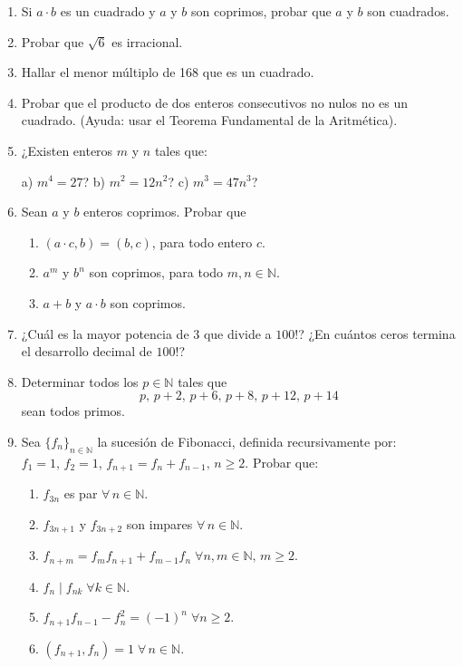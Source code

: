 \documentclass[a4paper,12pt,twoside,spanish,reqno]{amsbook}
\numberwithin{equation}{section}
\begin{document}
\begin{enumerate}
\item Si $a\cdot b$ es un cuadrado y $a$ y $b$ son coprimos, probar que $a$ y $b$ son cuadrados.


\item Probar que $\sqrt 6$ es irracional.





\item Hallar el menor múltiplo de 168 que es un cuadrado.


\item Probar que el producto de dos enteros consecutivos no nulos no es un cuadrado. (Ayuda: usar el Teorema Fundamental de la Aritmética).



\item ¿Existen enteros $m$ y $n$ tales que:

a) $m^4=27$? \qquad \qquad b) $m^2 = 12n^2$? \qquad \qquad c) $m^3 = 47n^3$?



\item Sean $a$ y $b$ enteros coprimos. Probar que
\begin{enumerate}
  \item $(a\cdot c, b)=(b,c)$, para todo entero $c$.
  \item $a^m$ y $b^n$ son coprimos, para todo $m,n\in \mathbb N$.
  \item $a+b$ y $a\cdot b$ son coprimos.
\end{enumerate}


\item ¿Cuál es la mayor potencia de $3$ que divide a $100!$? ¿En cuántos ceros termina el de\-sa\-rro\-llo decimal de $100!$?


\item Determinar todos los $p\in\mathbb N$ tales que
\[ p,\, p+2,\, p+6,\, p+8,\, p+12,\, p+14 \]
sean todos primos.


\item  Sea $\{f_n\}_{n\in\mathbb N}$ la sucesión de Fibonacci, definida recursivamente por: $f_1=1,\, f_2=1$, $f_{n+1}=f_{n}+f_{n-1},\, n\geq 2$. Probar que:
\begin{enumerate}
\item\label{fib-a} $f_{3n}$ es par $\forall\, n\in\mathbb N$.
\item\label{fib-b} $f_{3n+1}$ y $f_{3n+2}$ son impares $\forall\, n\in\mathbb N$.
\item\label{fib-c} $f_{n+m}=f_{m}f_{n+1}+f_{m-1}f_{n}\; \forall n,m\in\mathbb N,\, m\geq 2$.
\item\label{fib-d} $f_n\mid f_{nk}\;  \forall k\in\mathbb N$.
\item\label{fib-e} $f_{n+1}f_{n-1}-f_n^2=(-1)^n\; \forall n\geq 2$.
\item\label{fib-f} $(f_{n+1},f_n)=1\; \forall\, n\in\mathbb N$.
\end{enumerate}


\end{enumerate}
\end{document}

